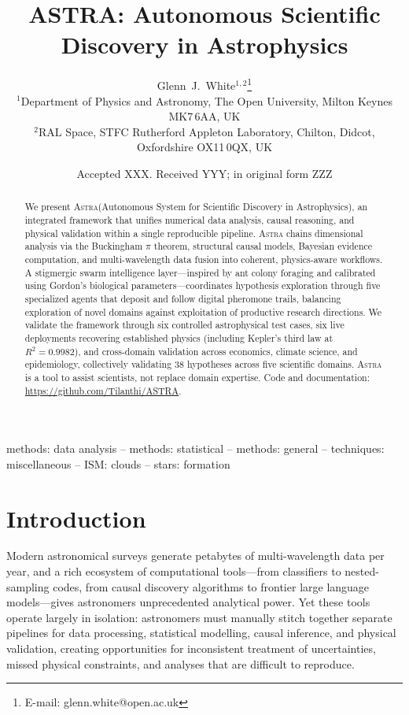 \documentclass[usenatbib]{rasti}
\title[ASTRA: Autonomous Scientific Discovery in Astrophysics]{ASTRA: Autonomous Scientific Discovery in Astrophysics}
\author[White]{
Glenn~J.~White$^{1,2}$\thanks{E-mail: glenn.white@open.ac.uk}\\
$^{1}$Department of Physics and Astronomy, The Open University, Milton Keynes MK7\,6AA, UK\\
$^{2}$RAL Space, STFC Rutherford Appleton Laboratory, Chilton, Didcot, Oxfordshire OX11\,0QX, UK
}
\date{Accepted XXX. Received YYY; in original form ZZZ}
\newcommand{\astra}{\textsc{Astra}\xspace}
\begin{document}
\maketitle

\begin{abstract}
We present \astra (Autonomous System for Scientific Discovery in Astrophysics), an integrated framework that unifies numerical data analysis, causal reasoning, and physical validation within a single reproducible pipeline.
\astra chains dimensional analysis via the Buckingham $\pi$ theorem, structural causal models, Bayesian evidence computation, and multi-wavelength data fusion into coherent, physics-aware workflows.
A stigmergic swarm intelligence layer---inspired by ant colony foraging and calibrated using Gordon's biological parameters---coordinates hypothesis exploration through five specialized agents that deposit and follow digital pheromone trails, balancing exploration of novel domains against exploitation of productive research directions.
We validate the framework through six controlled astrophysical test cases, six live deployments recovering established physics (including Kepler's third law at $R^{2}=0.9982$), and cross-domain validation across economics, climate science, and epidemiology, collectively validating 38 hypotheses across five scientific domains.
\astra is a tool to assist scientists, not replace domain expertise.
Code and documentation: \url{https://github.com/Tilanthi/ASTRA}.
\end{abstract}

\begin{keywords}
methods: data analysis -- methods: statistical -- methods: general -- techniques: miscellaneous -- ISM: clouds -- stars: formation
\end{keywords}

\section{Introduction}
\label{sec:introduction}

Modern astronomical surveys generate petabytes of multi-wavelength data per year, and a rich ecosystem of computational tools---from classifiers to nested-sampling codes, from causal discovery algorithms \citep{Spirtes2000} to frontier large language models---gives astronomers unprecedented analytical power.
Yet these tools operate largely in isolation: astronomers must manually stitch together separate pipelines for data processing, statistical modelling, causal inference, and physical validation, creating opportunities for inconsistent treatment of uncertainties, missed physical constraints, and analyses that are difficult to reproduce.
\end{document}
